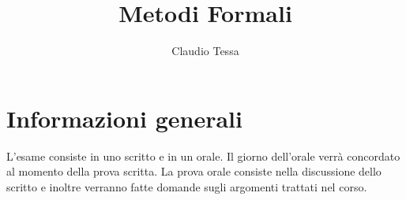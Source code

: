 \documentclass[12pt, a4paper]{article}
\title{Metodi Formali}
\author{Claudio Tessa}
\date{\the\year}
\begin{document}
\maketitle

\section*{Informazioni generali}
L'esame consiste in uno scritto e in un orale. Il giorno dell'orale verrà concordato al momento della prova scritta. La prova orale consiste nella discussione dello scritto e inoltre verranno fatte domande sugli argomenti trattati nel corso.

\tableofcontents
\newpage




\end{document}
